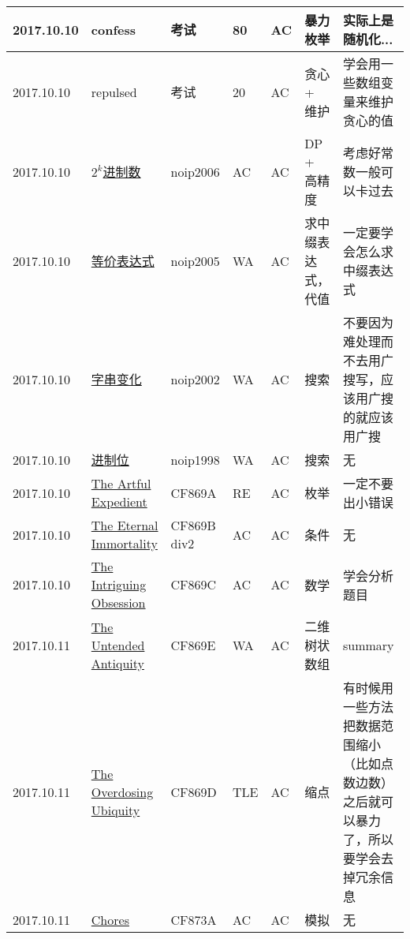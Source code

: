 \documentclass[a4paper]{article}
\begin{document}
\begin{longtable}{|p{1.5cm}|p{2.5cm}|p{1.6cm}|p{1.6cm}|p{1cm}|p{3cm}|p{4cm}|}
		\hline
		2017.10.10 & confess
		 & 考试 & 80 & AC & 暴力枚举 & 实际上是随机化...\\
		
		\hline
		2017.10.10 & repulsed
		 & 考试 & 20 & AC & 贪心 + 维护 & 学会用一些数组变量来维护贪心的值\\
		
		\hline
		2017.10.10 & \href {https://www.luogu.org/problem/show?pid=1066}{$2^k$进制数}
		 & noip2006 & AC & AC & DP + 高精度 & 考虑好常数一般可以卡过去\\
		
		\hline
		2017.10.10 & \href {https://www.luogu.org/problem/show?pid=1054#sub}{等价表达式}
		 & noip2005 & WA & AC & 求中缀表达式，代值 & 一定要学会怎么求中缀表达式\\
		
		\hline
		2017.10.10 & \href {https://www.luogu.org/problem/show?pid=1032}{字串变化}
		 & noip2002 & WA & AC & 搜索 & 不要因为难处理而不去用广搜写，应该用广搜的就应该用广搜\\
		
		\hline
		2017.10.10 & \href {https://www.luogu.org/problem/show?pid=1013}{进制位}
		 & noip1998 & WA & AC & 搜索 & 无\\
		
		\hline
		2017.10.10 & \href {http://codeforces.com/problemset/problem/869/A}{The Artful Expedient}
		 & CF869A & RE & AC & 枚举 & 一定不要出小错误\\
		
		\hline
		2017.10.10 & \href {http://codeforces.com/problemset/problem/869/B}{The Eternal Immortality}
		 & CF869B div2 & AC & AC & 条件 & 无\\
		
		\hline
		2017.10.10 & \href {http://codeforces.com/problemset/problem/869/C}{The Intriguing Obsession}
		 & CF869C & AC & AC & 数学 & 学会分析题目\\
		
		\hline
		2017.10.11 & \href {http://codeforces.com/problemset/problem/869/E}{The Untended Antiquity}
		 & CF869E & WA & AC & 二维树状数组 & summary\\
		
		\hline
		2017.10.11 & \href {http://codeforces.com/problemset/problem/869/D}{The Overdosing Ubiquity}
		 & CF869D & TLE & AC & 缩点 & 有时候用一些方法把数据范围缩小（比如点数边数）之后就可以暴力了，所以要学会去掉冗余信息\\
		
		\hline
		2017.10.11 & \href {http://codeforces.com/problemset/problem/873/A}{Chores}
		 & CF873A & AC & AC & 模拟 & 无\\
		

\end{longtable}
\end{document}
